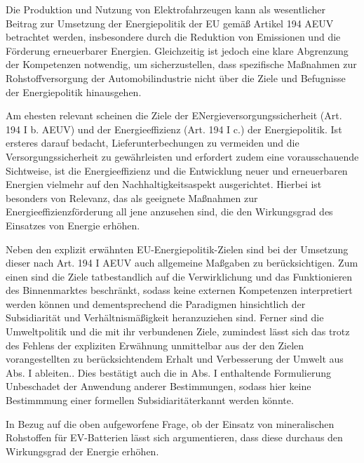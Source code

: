 \documentclass[12pt,a4paper,oneside]{book} %
\begin{document}
Die Produktion und Nutzung von Elektrofahrzeugen kann als wesentlicher Beitrag zur Umsetzung der Energiepolitik der EU gemäß Artikel 194 AEUV betrachtet werden, insbesondere durch die Reduktion von Emissionen und die Förderung erneuerbarer Energien. Gleichzeitig ist jedoch eine klare Abgrenzung der Kompetenzen notwendig, um sicherzustellen, dass spezifische Maßnahmen zur Rohstoffversorgung der Automobilindustrie nicht über die Ziele und Befugnisse der Energiepolitik hinausgehen.
	
Am ehesten relevant scheinen die Ziele der ENergieversorgungssicherheit (Art. 194 I b. AEUV) und der Energieeffizienz (Art. 194 I c.) der Energiepolitik. Ist ersteres darauf bedacht, Lieferunterbechungen zu vermeiden und die Versorgungssicherheit zu gewährleisten\autocite[Nettesheim, Art. 194 Rn 16]{grabitz_recht_2024} und erfordert zudem eine vorausschauende Sichtweise\autocite[631]{umbach_europaische_2005}, ist die Energieeffizienz und die Entwicklung neuer und erneuerbaren Energien vielmehr auf den Nachhaltigkeitsaspekt ausgerichtet.\autocite[Nettesheim, Art. 194 Rn 17]{grabitz_recht_2024} Hierbei ist besonders von Relevanz, das als geeignete Maßnahmen zur Energieeffizienzförderung all jene anzusehen sind, die den Wirkungsgrad des Einsatzes von Energie erhöhen.\autocite[Nettesheim, Art. 194 Rn 16]{grabitz_recht_2024}
	
Neben den explizit erwähnten EU-Energiepolitik-Zielen sind bei der Umsetzung dieser nach Art. 194 I AEUV auch allgemeine Maßgaben zu berücksichtigen. Zum einen sind die Ziele \glqq tatbestandlich auf die Verwirklichung und das Funktionieren des Binnenmarktes beschränkt\grqq \autocite{Bings in Streinz, Art. 194 Rn. 32f.}, sodass keine externen Kompetenzen interpretiert werden können\autocite{Bings in Streinz, Art. 194 Rn. 33} und dementsprechend die Paradigmen hinsichtlich der Subsidiarität und Verhältnismäßigkeit heranzuziehen sind. Ferner sind die Umweltpolitik und die mit ihr verbundenen Ziele, zumindest lässt sich das trotz des Fehlens der expliziten Erwähnung unmittelbar aus der den Zielen vorangestellten zu berücksichtendem Erhalt und Verbesserung der Umwelt aus Abs. I ableiten.\autocite{Bings in Streinz, Art. 194 Rn. 33}. Dies bestätigt auch die in Abs. I enthaltende Formulierung \glqq Unbeschadet der Anwendung anderer Bestimmungen\grqq, sodass hier keine Bestimmmung einer \glqq formellen Subsidiarität\grqq erkannt werden könnte.\autocite{Nettesheim, Grabitz/Hilf/nettesheim AEUV Art. 194, Rn 35}
	
In Bezug auf die oben aufgeworfene Frage, ob der Einsatz von mineralischen Rohstoffen für EV-Batterien lässt sich argumentieren, dass diese durchaus den Wirkungsgrad der Energie erhöhen. 
	
\end{document}
